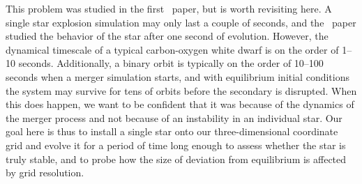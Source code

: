\documentclass[12pt]{article}
\begin{document}
This problem was studied in the first \castro\ paper, but is worth
revisiting here. A single star explosion simulation may only last a
couple of seconds, and the \castro\ paper studied the behavior of the
star after one second of evolution. However, the dynamical timescale
of a typical carbon-oxygen white dwarf is on the order of 1--10
seconds. Additionally, a binary orbit is typically on the order of
10--100 seconds when a merger simulation starts, and with equilibrium
initial conditions the system may survive for tens of orbits before
the secondary is disrupted. When this does happen, we want to be
confident that it was because of the dynamics of the merger process
and not because of an instability in an individual star. Our goal here
is thus to install a single star onto our three-dimensional
coordinate grid and evolve it for a period of time long enough to
assess whether the star is truly stable, and to probe how the size of
deviation from equilibrium is affected by grid resolution.
\end{document}
